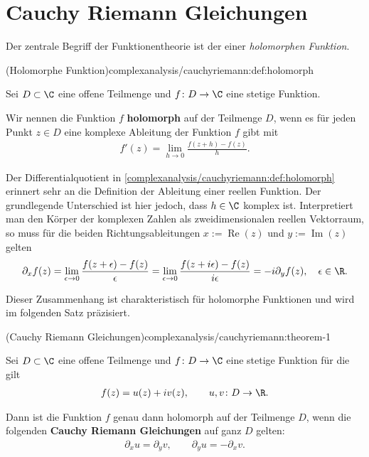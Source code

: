\documentclass[letterpaper,10pt,german]{jupyterBook}
\begin{document}
\section{Cauchy Riemann Gleichungen}
\label{\detokenize{complexanalysis/cauchyriemann:cauchy-riemann-gleichungen}}\label{\detokenize{complexanalysis/cauchyriemann::doc}}
\par
Der zentrale Begriff der Funktionentheorie ist der einer \emph{holomorphen Funktion}.
\begin{definition}{(Holomorphe Funktion)}{complexanalysis/cauchyriemann:def:holomorph}



\par
Sei \(D \subset \C\) eine offene Teilmenge und \(f \colon D \rightarrow \C\) eine stetige Funktion.

\par
Wir nennen die Funktion \(f\) \textbf{holomorph} auf der Teilmenge \(D\), wenn es für jeden Punkt \(z \in D\) eine komplexe Ableitung der Funktion \(f\) gibt mit
\begin{align*}
f'(z) = \lim_{h\rightarrow 0} \frac{f(z+h) - f(z)}{h}.
\end{align*}\end{definition}

\par
Der Differentialquotient in \cref{complexanalysis/cauchyriemann:def:holomorph} erinnert sehr an die Definition der Ableitung einer reellen Funktion.
Der grundlegende Unterschied ist hier jedoch, dass \(h \in \C\) komplex ist.
Interpretiert man den Körper der komplexen Zahlen als zweidimensionalen reellen Vektorraum, so muss für die beiden Richtungsableitungen \(x := \operatorname{Re}(z)\) und \(y := \operatorname{Im}(z)\) gelten
\begin{align*}
\partial_x f(z) = \lim_{\epsilon \rightarrow 0} \frac{f(z+\epsilon) - f(z)}{\epsilon} = \lim_{\epsilon \rightarrow 0} \frac{f(z+i\epsilon) - f(z)}{i\epsilon} = -i \partial_y f(z), \quad \epsilon \in \R.
\end{align*}
\par
Dieser Zusammenhang ist charakteristisch für holomorphe Funktionen und wird im folgenden Satz präzisiert.
\begin{theorem}{(Cauchy Riemann Gleichungen)}{complexanalysis/cauchyriemann:theorem-1}



\par
Sei \(D \subset \C\) eine offene Teilmenge und \(f \colon D \rightarrow \C\) eine stetige Funktion für die gilt
\begin{align*}
f(z) = u(z) + i v(z), \qquad u,v \colon D \rightarrow \R.
\end{align*}
\par
Dann ist die Funktion \(f\) genau dann holomorph auf der Teilmenge \(D\), wenn die folgenden \textbf{Cauchy Riemann Gleichungen} auf ganz \(D\) gelten:
\begin{align*}
\partial_x u = \partial_y v, \qquad \partial_y u = -\partial_x v.
\end{align*}\end{theorem}
\end{document}
